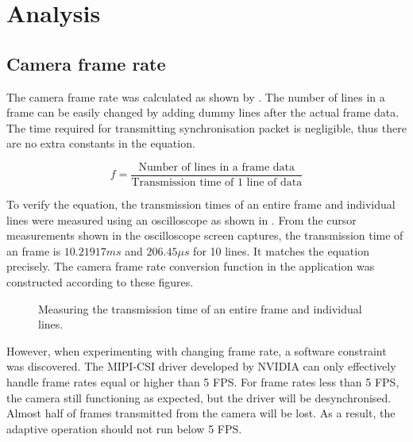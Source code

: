 \chapter{Analysis} \label{Chapter:Analysis}

\section{Camera frame rate}
\label{ana:cam:fps}

The camera frame rate was calculated as shown by . The number of lines in a frame can be easily changed by adding dummy lines after the actual frame data. The time required for transmitting synchronisation packet is negligible, thus there are no extra constants in the equation.

\begin{equation}
	f = \frac{\text{Number of lines in a frame data}}{\text{Transmission time of 1 line of data}}
	\label{ana:cam:eq:rate}
\end{equation}

To verify the equation, the transmission times of an entire frame and individual lines were measured using an oscilloscope as shown in . From the cursor measurements shown in the oscilloscope screen captures, the transmission time of an frame is $10.21917 ms$ and $206.45 \mu s$ for 10 lines. It matches the equation precisely. The camera frame rate conversion function in the application was constructed according to these figures.

\begin{figure}[!htb]
  \centering
  \caption{Measuring the transmission time of an entire frame and individual lines.}
  \label{ana:cam:osc:time}
\end{figure}

However, when experimenting with changing frame rate, a software constraint was discovered. The MIPI-CSI driver developed by NVIDIA can only effectively handle frame rates equal or higher than 5 FPS. For frame rates less than 5 FPS, the camera still functioning as expected, but the driver will be desynchronised. Almost half of frames transmitted from the camera will be lost. As a result, the adaptive operation should not run below 5 FPS.

